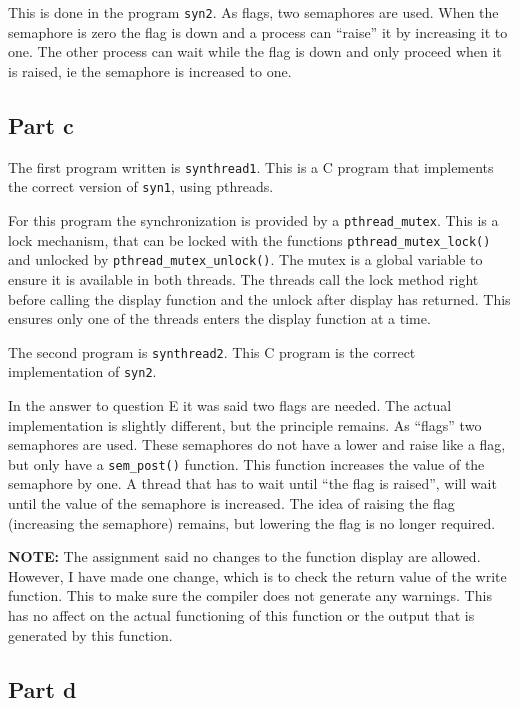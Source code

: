 \documentclass[a4paper]{article}
\begin{document}
This is done in the program \texttt{syn2}. As flags, two semaphores are used. When the 
semaphore is zero the flag is down and a process can ``raise'' it by increasing it to one. 
The other process can wait while the flag is down and only proceed when it is raised, ie 
the semaphore is increased to one.

\subsection{Part c}

The first program written is \texttt{synthread1}. This is a C program that implements the
correct version of \texttt{syn1}, using pthreads.

For this program the synchronization is provided by a \texttt{pthread\_mutex}. This is a 
lock mechanism, that can be locked with the functions \texttt{pthread\_mutex\_lock()} and
unlocked by \texttt{pthread\_mutex\_unlock()}. The mutex is a global variable to ensure it 
is available in both threads. The threads call the lock method right before calling the
display function and the unlock after display has returned. This ensures only one of the
threads enters the display function at a time.

The second program is \texttt{synthread2}. This C program is the correct implementation of
\texttt{syn2}.

In the answer to question E it was said two flags are needed. The actual implementation is
slightly different, but the principle remains. As ``flags'' two semaphores are used. These
semaphores do not have a lower and raise like a flag, but only have a \texttt{sem\_post()}
function. This function increases the value of the semaphore by one. A thread that has to
wait until ``the flag is raised'', will wait until the value of the semaphore is 
increased. The idea of raising the flag (increasing the semaphore) remains, but lowering 
the flag is no longer required.

\textbf{NOTE:} The assignment said no changes to the function display are allowed. 
However, I have made one change, which is to check the return value of the write function.
This to make sure the compiler does not generate any warnings. This has no affect on the
actual functioning of this function or the output that is generated by this function.

\subsection{Part d}
\end{document}
